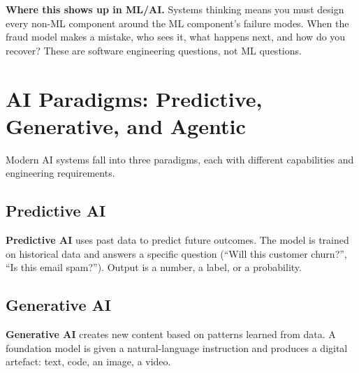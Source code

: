 \documentclass[a4paper,11pt]{article}
\newcommand{\vocab}[1]{\textbf{\color{navy}#1}}
\begin{document}
\begin{center}
\end{center}

\noindent\textbf{Where this shows up in ML/AI.} Systems thinking means you must design every non-ML component around the ML component's failure modes. When the fraud model makes a mistake, who sees it, what happens next, and how do you recover? These are software engineering questions, not ML questions.

\section{AI Paradigms: Predictive, Generative, and Agentic}

Modern AI systems fall into three paradigms, each with different capabilities and engineering requirements.

\subsection{Predictive AI}

\vocab{Predictive AI} uses past data to predict future outcomes. The model is trained on historical data and answers a specific question (``Will this customer churn?'', ``Is this email spam?''). Output is a number, a label, or a probability.

\subsection{Generative AI}

\vocab{Generative AI} creates new content based on patterns learned from data. A foundation model is given a natural-language instruction and produces a digital artefact: text, code, an image, a video.
\end{document}
